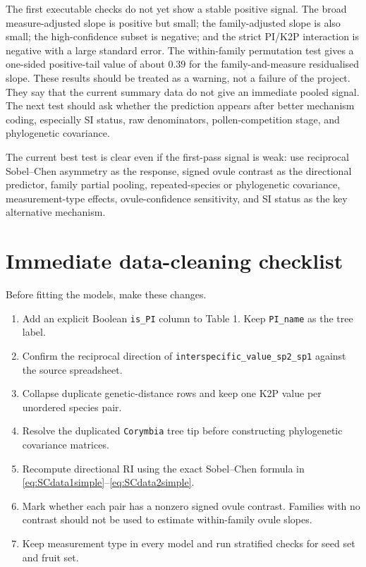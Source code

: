 \documentclass[12pt]{article}
\begin{document}




The first executable checks do not yet show a stable positive signal. The broad measure-adjusted slope is positive but small; the family-adjusted slope is also small; the high-confidence subset is negative; and the strict PI/K2P interaction is negative with a large standard error. The within-family permutation test gives a one-sided positive-tail value of about $0.39$ for the family-and-measure residualised slope. These results should be treated as a warning, not a failure of the project. They say that the current summary data do not give an immediate pooled signal. The next test should ask whether the prediction appears after better mechanism coding, especially SI status, raw denominators, pollen-competition stage, and phylogenetic covariance.

\begin{conclusionbox}
The current best test is clear even if the first-pass signal is weak: use reciprocal Sobel--Chen asymmetry as the response, signed ovule contrast as the directional predictor, family partial pooling, repeated-species or phylogenetic covariance, measurement-type effects, ovule-confidence sensitivity, and SI status as the key alternative mechanism.
\end{conclusionbox}


\section{Immediate data-cleaning checklist}

Before fitting the models, make these changes.

\begin{enumerate}
\item Add an explicit Boolean \texttt{is\_PI} column to Table 1. Keep \texttt{PI\_name} as the tree label.
\item Confirm the reciprocal direction of \texttt{interspecific\_value\_sp2\_sp1} against the source spreadsheet.
\item Collapse duplicate genetic-distance rows and keep one K2P value per unordered species pair.
\item Resolve the duplicated \texttt{Corymbia} tree tip before constructing phylogenetic covariance matrices.
\item Recompute directional RI using the exact Sobel--Chen formula in \eqref{eq:SCdata1simple}--\eqref{eq:SCdata2simple}.
\item Mark whether each pair has a nonzero signed ovule contrast. Families with no contrast should not be used to estimate within-family ovule slopes.
\item Keep measurement type in every model and run stratified checks for seed set and fruit set.
\end{enumerate}
\end{document}
